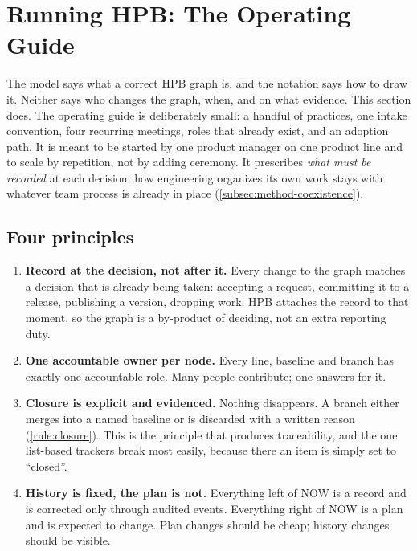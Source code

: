 \section{Running HPB: The Operating Guide}
\label{sec:operating}

The model says what a correct HPB graph is, and the notation says how to
draw it. Neither says who changes the graph, when, and on what evidence.
This section does. The operating guide is deliberately small: a handful
of practices, one intake convention, four recurring meetings, roles that
already exist, and an adoption path. It is meant to be started by one
product manager on one product line and to scale by repetition, not by
adding ceremony. It prescribes \emph{what must be recorded} at each
decision; how engineering organizes its own work stays with whatever
team process is already in place (\cref{subsec:method-coexistence}).

\subsection{Four principles}
\label{subsec:method-principles}

\begin{enumerate}[label=\textbf{M\arabic*},leftmargin=*,itemsep=2pt]
  \item \textbf{Record at the decision, not after it.} Every change to the
    graph matches a decision that is already being taken: accepting a
    request, committing it to a release, publishing a version, dropping
    work. HPB attaches the record to that moment, so the graph is a
    by-product of deciding, not an extra reporting duty.
  \item \textbf{One accountable owner per node.} Every line, baseline and
    branch has exactly one accountable role. Many people contribute; one
    answers for it.
  \item \textbf{Closure is explicit and evidenced.} Nothing disappears.
    A branch either merges into a named baseline or is discarded with a
    written reason (\cref{rule:closure}). This is the principle that
    produces traceability, and the one list-based trackers break most
    easily, because there an item is simply set to ``closed''.
  \item \textbf{History is fixed, the plan is not.} Everything left of NOW
    is a record and is corrected only through audited events. Everything
    right of NOW is a plan and is expected to change. Plan changes should
    be cheap; history changes should be visible.
\end{enumerate}

